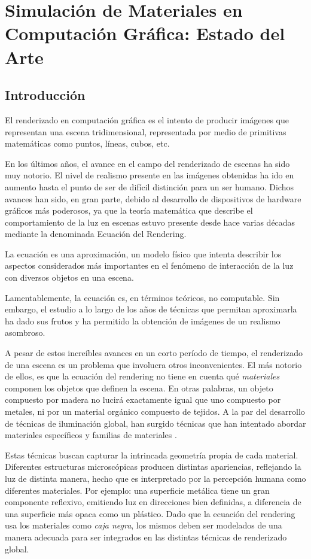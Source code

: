 
\chapter[Estado del Arte]{Simulación de Materiales en Computación Gráfica: Estado del Arte}
\section{Introducción} %
El renderizado en computación gráfica es el intento de producir imágenes que representan una escena tridimensional, representada por medio de primitivas matemáticas como puntos, líneas, cubos, etc.

En los últimos años, el avance en el campo del renderizado de escenas ha sido muy notorio. El nivel de realismo presente en las imágenes obtenidas ha ido en aumento hasta el punto de ser de difícil distinción para un ser humano. Dichos avances han sido, en gran parte, debido al desarrollo de dispositivos de hardware gráficos más poderosos, ya que la teoría matemática que describe el comportamiento de la luz en escenas estuvo presente desde hace varias décadas \cite{Kajiya} mediante la denominada Ecuación del Rendering.


La ecuación es una aproximación, un modelo físico que intenta describir los aspectos considerados más importantes en el fenómeno de interacción de la luz con diversos objetos en una escena.

Lamentablemente, la ecuación es, en términos teóricos, no computable. Sin embargo, el estudio a lo largo de los años de técnicas que permitan aproximarla ha dado sus frutos y ha permitido la obtención de imágenes de un realismo asombroso.

A pesar de estos increíbles avances en un corto período de tiempo, el renderizado de una escena es un problema que involucra otros inconvenientes. El más notorio de ellos, es que la ecuación del rendering no tiene en cuenta qué {\em materiales} componen los objetos que definen la escena. En otras palabras, un objeto compuesto por madera no lucirá exactamente igual que uno compuesto por metales, ni por un material orgánico compuesto de tejidos. A la par del desarrollo de técnicas de iluminación global, han surgido técnicas que han intentado abordar materiales específicos \cite{} y familias de materiales \cite{}.

Estas técnicas buscan capturar la intrincada geometría propia de cada material. Diferentes estructuras microscópicas producen distintas apariencias, reflejando la luz de distinta manera, hecho que es interpretado por la percepción humana como diferentes materiales. Por ejemplo: una superficie metálica tiene un gran componente reflexivo, emitiendo luz en direcciones bien definidas, a diferencia de una superficie más opaca como un plástico. Dado que la ecuación del rendering usa los materiales como {\em caja negra}, los mismos deben ser modelados de una manera adecuada para ser integrados en las distintas técnicas de renderizado global.

